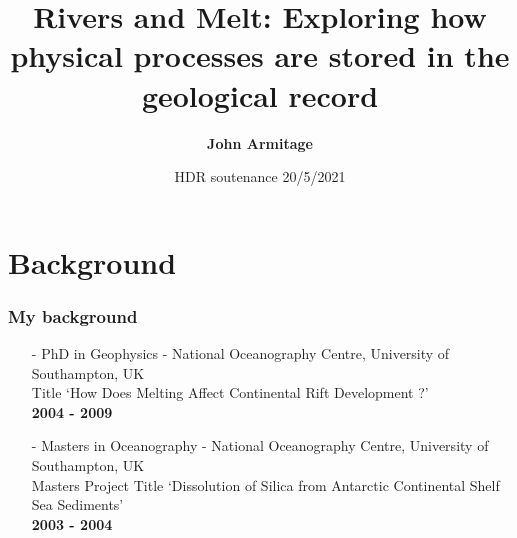 \documentclass[aspectratio=169]{beamer}
\title[HDR soutenance]{Rivers and Melt: Exploring how physical processes are stored in the geological record}
\author[Armitage]{{\bf John Armitage}\inst{1}}
\institute[IFPEN]
{
  \inst{1}
  IFP Energies Nouvelles, France
}
\date[20 May]{HDR soutenance 20/5/2021}
\begin{document}
\newcommand{\SubItem}[1]{
    {\setlength\itemindent{15pt} \item[-] #1}
}

{
\begin{frame}
  \titlepage
\end{frame}
}

\section{Background}

\begin{frame}
    \frametitle{My background}
    \begin{itemize}
        \item[-]{PhD in Geophysics - National Oceanography Centre, University of Southampton, UK \\
              Title `How Does Melting Affect Continental Rift Development ?' \\
              \bf{2004 - 2009}}
        \item[-]{Masters in Oceanography - National Oceanography Centre, University of Southampton, UK \\
              Masters Project Title `Dissolution of Silica from Antarctic Continental Shelf Sea Sediments' \\
              \bf{2003 - 2004}}
    \end{itemize}
\end{frame}
\end{document}
